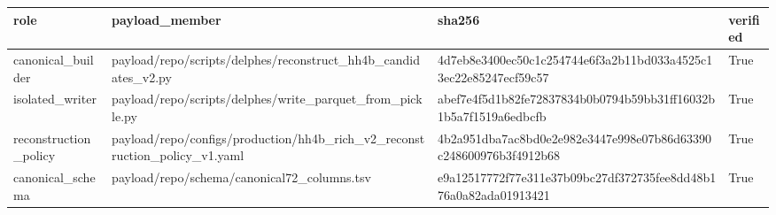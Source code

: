 \begin{tabular}{llll}
\toprule
role & payload\_member & sha256 & verified \\
\midrule
canonical\_builder & payload/repo/scripts/delphes/reconstruct\_hh4b\_candidates\_v2.py & 4d7eb8e3400ec50c1c254744e6f3a2b11bd033a4525c13ec22e85247ecf59c57 & True \\
isolated\_writer & payload/repo/scripts/delphes/write\_parquet\_from\_pickle.py & abef7e4f5d1b82fe72837834b0b0794b59bb31ff16032b1b5a7f1519a6edbcfb & True \\
reconstruction\_policy & payload/repo/configs/production/hh4b\_rich\_v2\_reconstruction\_policy\_v1.yaml & 4b2a951dba7ac8bd0e2e982e3447e998e07b86d63390c248600976b3f4912b68 & True \\
canonical\_schema & payload/repo/schema/canonical72\_columns.tsv & e9a12517772f77e311e37b09bc27df372735fee8dd48b176a0a82ada01913421 & True \\
\bottomrule
\end{tabular}
